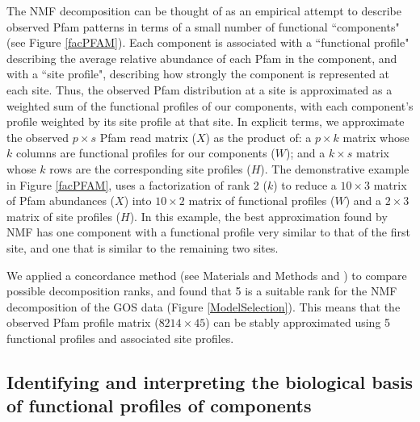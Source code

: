 The NMF decomposition can be thought of as an empirical attempt to describe observed Pfam patterns in terms of a small number of functional ``components" (see Figure \ref{facPFAM}).  Each component is associated with a ``functional profile" describing the average relative abundance of each Pfam in the component, and with a ``site profile", describing how strongly the component is represented at each site.  Thus, the observed Pfam distribution at a site is approximated as a weighted sum of the functional profiles of our components, with each component's profile weighted by its site profile at that site. In explicit terms, we approximate the observed $p\times s$ Pfam read matrix ($X$) as the product of: a $p\times k$ matrix whose $k$ columns are functional profiles for our components ($W$); and a $k\times s$ matrix whose $k$ rows are the corresponding site profiles ($H$). The demonstrative example in Figure \ref{facPFAM}, uses a factorization of rank 2 ($k$) to reduce a $10\times 3$ matrix of Pfam abundances ($X$) into $10\times 2$ matrix of functional profiles ($W$) and a $2\times 3$ matrix of site profiles ($H$). In this example, the best approximation found by NMF has one component with a functional profile very similar to that of the first site, and one that is similar to the remaining two sites.

We applied a concordance method (see Materials and Methods and \cite{JianWeit12}) to compare possible decomposition ranks, and found that 5 is a suitable rank for the NMF decomposition of the GOS data (Figure \ref{ModelSelection}). This means that the observed Pfam profile matrix ($8214 \times 45$) can be stably approximated using 5 functional profiles and associated site profiles. 

\subsection{Identifying and interpreting the biological basis of functional profiles of components}

